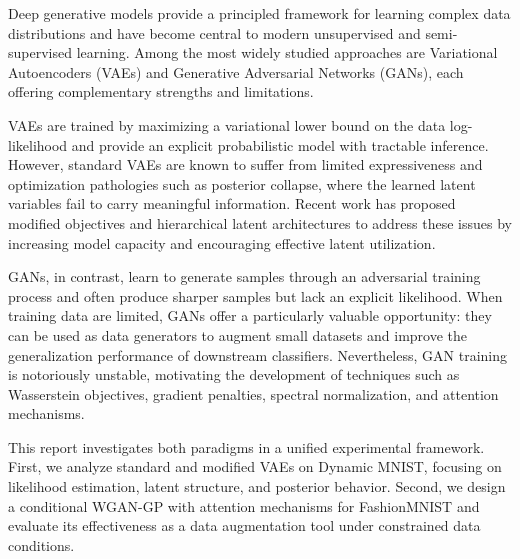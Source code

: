Deep generative models provide a principled framework for learning complex data distributions and have become central to modern unsupervised and semi-supervised learning. Among the most widely studied approaches are Variational Autoencoders (VAEs) and Generative Adversarial Networks (GANs), each offering complementary strengths and limitations.

VAEs are trained by maximizing a variational lower bound on the data log-likelihood and provide an explicit probabilistic model with tractable inference. However, standard VAEs are known to suffer from limited expressiveness and optimization pathologies such as posterior collapse, where the learned latent variables fail to carry meaningful information. Recent work has proposed modified objectives and hierarchical latent architectures to address these issues by increasing model capacity and encouraging effective latent utilization.

GANs, in contrast, learn to generate samples through an adversarial training process and often produce sharper samples but lack an explicit likelihood. When training data are limited, GANs offer a particularly valuable opportunity: they can be used as data generators to augment small datasets and improve the generalization performance of downstream classifiers. Nevertheless, GAN training is notoriously unstable, motivating the development of techniques such as Wasserstein objectives, gradient penalties, spectral normalization, and attention mechanisms.

This report investigates both paradigms in a unified experimental framework. First, we analyze standard and modified VAEs on Dynamic MNIST, focusing on likelihood estimation, latent structure, and posterior behavior. Second, we design a conditional WGAN-GP with attention mechanisms for FashionMNIST and evaluate its effectiveness as a data augmentation tool under constrained data conditions.
